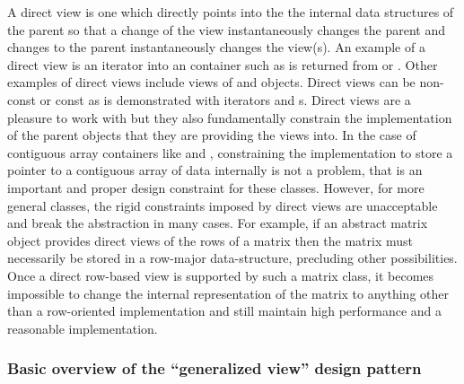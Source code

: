 \documentclass[pdf,ps2pdf,11pt]{SANDreport}
\begin{document}
A direct view is one which directly points into the the internal data
structures of the parent so that a change of the view instantaneously
changes the parent and changes to the parent instantaneously changes
the view(s).  An example of a direct view is an iterator into an
container such as is returned from {} or
{}.  Other examples of direct views include
{} views of {} and {} objects.
Direct views can be non-const or const as is demonstrated with
iterators and {}s.  Direct views are a pleasure to work
with but they also fundamentally constrain the implementation of the
parent objects that they are providing the views into.  In the case of
contiguous array containers like {} and
{}, constraining the implementation to store a pointer
to a contiguous array of data internally is not a problem, that is an
important and proper design constraint for these classes.  However,
for more general classes, the rigid constraints imposed by direct
views are unacceptable and break the abstraction in many cases.  For
example, if an abstract matrix object provides direct views of the
rows of a matrix then the matrix must necessarily be stored in a
row-major data-structure, precluding other possibilities.  Once a
direct row-based view is supported by such a matrix class, it becomes
impossible to change the internal representation of the matrix to
anything other than a row-oriented implementation and still maintain
high performance and a reasonable implementation.


%
{}\subsubsection*{Basic overview of the ``generalized view'' design
pattern}
%
\end{document}
